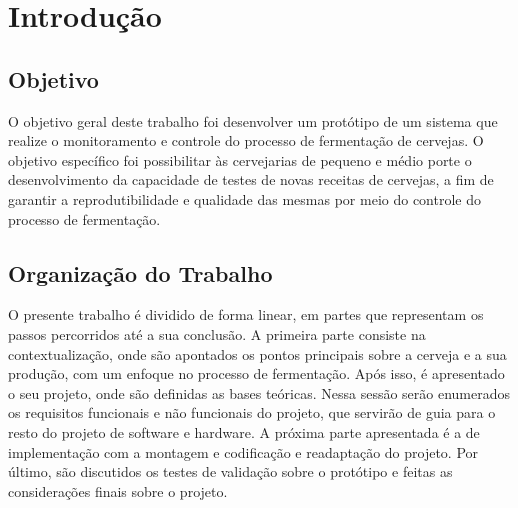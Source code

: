 \chapter{Introdução}

\section{Objetivo}

O objetivo geral deste trabalho foi desenvolver um protótipo de um sistema que realize o monitoramento e controle do processo de fermentação de cervejas.
O objetivo específico foi possibilitar às cervejarias de pequeno e médio porte o desenvolvimento da capacidade de testes de novas receitas de cervejas, 
a fim de garantir a reprodutibilidade e qualidade das mesmas por meio do controle do processo de fermentação.


\section{Organização do Trabalho}

O presente trabalho é dividido de forma linear, em partes que representam os passos percorridos até a sua conclusão. A primeira parte consiste na contextualização, onde são apontados os pontos principais sobre a cerveja e a sua produção, com um enfoque no processo de fermentação. Após isso, é apresentado o seu projeto, onde são definidas as bases teóricas. Nessa sessão serão enumerados os requisitos funcionais e não funcionais do projeto, que servirão de guia para o resto do projeto de software e hardware. A próxima parte apresentada é a de implementação com a montagem e codificação e readaptação do projeto. Por último, são discutidos os testes de validação sobre o protótipo e feitas as considerações finais sobre o projeto.
